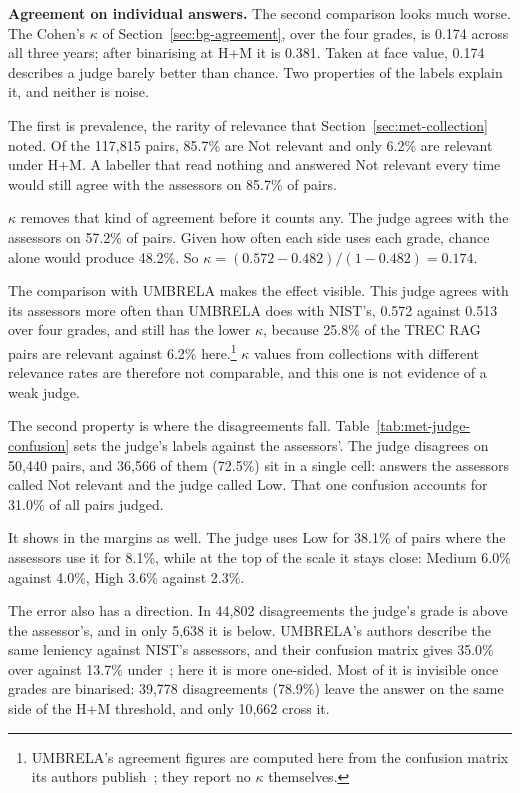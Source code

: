 \textbf{Agreement on individual answers.} The second comparison looks much worse. The
Cohen's $\kappa$ of Section~\ref{sec:bg-agreement}, over the four grades, is 0.174
across all three years; after binarising at H+M it is 0.381. Taken at face value,
0.174 describes a judge barely better than chance. Two properties of the labels
explain it, and neither is noise.

The first is prevalence, the rarity of relevance that
Section~\ref{sec:met-collection} noted. Of the 117{,}815 pairs, 85.7\% are Not
relevant and only 6.2\% are relevant under H+M. A labeller that read nothing and
answered Not relevant every time would still agree with the assessors on 85.7\% of
pairs.

$\kappa$ removes that kind of agreement before it counts any. The judge agrees with
the assessors on 57.2\% of pairs. Given how often each side uses each grade, chance
alone would produce 48.2\%. So $\kappa = (0.572 - 0.482)/(1 - 0.482) = 0.174$.

The comparison with UMBRELA makes the effect visible. This judge agrees with its
assessors more often than UMBRELA does with NIST's, 0.572 against 0.513 over four
grades, and still has the lower $\kappa$, because 25.8\% of the TREC RAG pairs are
relevant against 6.2\% here.\footnote{UMBRELA's agreement figures are computed here
from the confusion matrix its authors publish~\cite[Figure~5]{upadhyay2025umbrela};
they report no $\kappa$ themselves.} $\kappa$ values from collections with different
relevance rates are therefore not comparable, and this one is not evidence of a weak
judge.

The second property is where the disagreements fall.
Table~\ref{tab:met-judge-confusion} sets the judge's labels against the assessors'.
The judge disagrees on 50{,}440 pairs, and 36{,}566 of them (72.5\%) sit in a single
cell: answers the assessors called Not relevant and the judge called Low. That one
confusion accounts for 31.0\% of all pairs judged.

It shows in the margins as well. The judge uses Low for 38.1\% of pairs where the
assessors use it for 8.1\%, while at the top of the scale it stays close: Medium
6.0\% against 4.0\%, High 3.6\% against 2.3\%.

The error also has a direction. In 44{,}802 disagreements the judge's grade is above
the assessor's, and in only 5{,}638 it is below. UMBRELA's authors describe the same
leniency against NIST's assessors, and their confusion matrix gives 35.0\% over against
13.7\% under~\cite[Figure~5]{upadhyay2025umbrela}; here it is more one-sided. Most of it is invisible
once grades are binarised: 39{,}778 disagreements (78.9\%) leave the answer on the
same side of the H+M threshold, and only 10{,}662 cross it.

